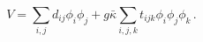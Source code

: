 \begin{equation}
V = \sum_{i, j}d_{ij} \phi_i \phi_j + g \bar{\kappa}
\sum_{i, j, k}t_{ijk} \phi_i \phi_j \phi_k \,.
\label{eq:scalar-potential}
\end{equation}

